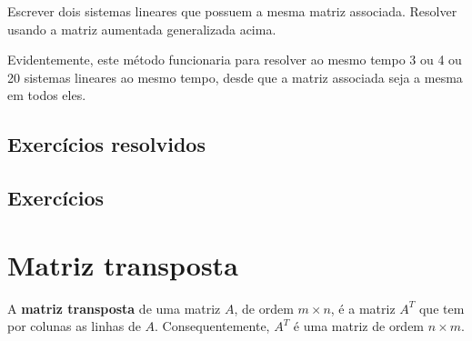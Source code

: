 \documentclass[../livro.tex]{subfiles}  %
\begin{document}
\begin{exercise}
	Escrever dois sistemas lineares que possuem a mesma matriz associada. Resolver usando a matriz aumentada generalizada acima.
\end{exercise}

Evidentemente, este método funcionaria para resolver ao mesmo tempo 3 ou 4 ou 20 sistemas lineares ao mesmo tempo, desde que a matriz associada seja a mesma em todos eles.

\subsection*{Exercícios resolvidos}

\construirExeresol

\subsection*{Exercícios}

\construirExer


\section{Matriz transposta}


A \textbf{matriz transposta} de uma matriz $A$, de ordem $m\times n$, é a matriz $A^T$ que tem por colunas as linhas de $A$. Consequentemente, $A^T$ é uma matriz de ordem $n \times m$.
\end{document}
